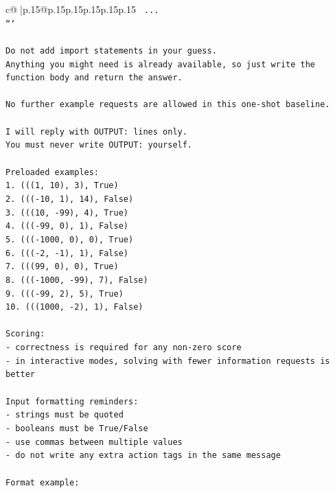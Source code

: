 \documentclass{article}
\begin{document}
{\begin{supertabular}{c@{$\;$}|p{.15\linewidth}@{}p{.15\linewidth}p{.15\linewidth}p{.15\linewidth}p{.15\linewidth}p{.15\linewidth}}
{{{\texttt{    ...} \\
\texttt{```} \\
\\ 
\texttt{Do not add import statements in your guess.} \\
\texttt{Anything you might need is already available, so just write the function body and return the answer.} \\
\\ 
\texttt{No further example requests are allowed in this one{-}shot baseline.} \\
\\ 
\texttt{I will reply with OUTPUT: lines only.} \\
\texttt{You must never write OUTPUT: yourself.} \\
\\ 
\texttt{Preloaded examples:} \\
\texttt{1. (((1, 10), 3), True)} \\
\texttt{2. ((({-}10, 1), 14), False)} \\
\texttt{3. (((10, {-}99), 4), True)} \\
\texttt{4. ((({-}99, 0), 1), False)} \\
\texttt{5. ((({-}1000, 0), 0), True)} \\
\texttt{6. ((({-}2, {-}1), 1), False)} \\
\texttt{7. (((99, 0), 0), True)} \\
\texttt{8. ((({-}1000, {-}99), 7), False)} \\
\texttt{9. ((({-}99, 2), 5), True)} \\
\texttt{10. (((1000, {-}2), 1), False)} \\
\\ 
\texttt{Scoring:} \\
\texttt{{-} correctness is required for any non{-}zero score} \\
\texttt{{-} in interactive modes, solving with fewer information requests is better} \\
\\ 
\texttt{Input formatting reminders:} \\
\texttt{{-} strings must be quoted} \\
\texttt{{-} booleans must be True/False} \\
\texttt{{-} use commas between multiple values} \\
\texttt{{-} do not write any extra action tags in the same message} \\
\\ 
\texttt{Format example:} \\
}}}
\end{supertabular}}
\end{document}
